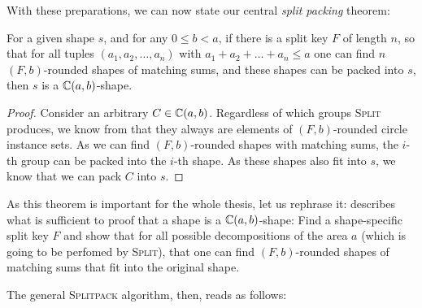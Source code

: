 \documentclass[%
    a4paper,              %
    style=screen,          %
    bibliography=totoc,   %
    nexus,                %
    lnum,                 %
    extramargin,          %
]{tubsbook}
\begin{document}
%

With these preparations, we can now state our central \emph{split packing} theorem:

\begin{theorem}\label{th:splitpack}
    For a given shape $s$, and for any $0 \le b < a$, if there is a split key $F$ of length $n$, so that for all tuples $(a_1, a_2, \dots, a_n)$ with $a_1 + a_2 + \dots + a_n \le a$
    one can find $n$ $(F,b)$-rounded shapes of matching sums,
    and these shapes can be packed into $s$, then $s$ is a $\mathbb{C}(a,b)$-shape.
\end{theorem}

\begin{proof}
    Consider an arbitrary $C \in \mathbb{C}(a,b)$. Regardless of which groups \textsc{Split} produces, we know from  that they always are elements of $(F,b)$-rounded circle instance sets.
    As we can find $(F,b)$-rounded shapes with matching sums, the $i$-th group can be packed into the $i$-th shape.
    As these shapes also fit into $s$, we know that we can pack $C$ into $s$.
\end{proof}

As this theorem is important for the whole thesis, let us rephrase it:  describes what is sufficient to proof that a shape is a $\mathbb{C}(a,b)$-shape: Find a shape-specific split key $F$ and show that for all possible decompositions of the area $a$ (which is going to be perfomed by \textsc{Split}), that one can find $(F,b)$-rounded shapes of matching sums that fit into the original shape.

The general \textsc{Splitpack} algorithm, then, reads as follows:
\end{document}
